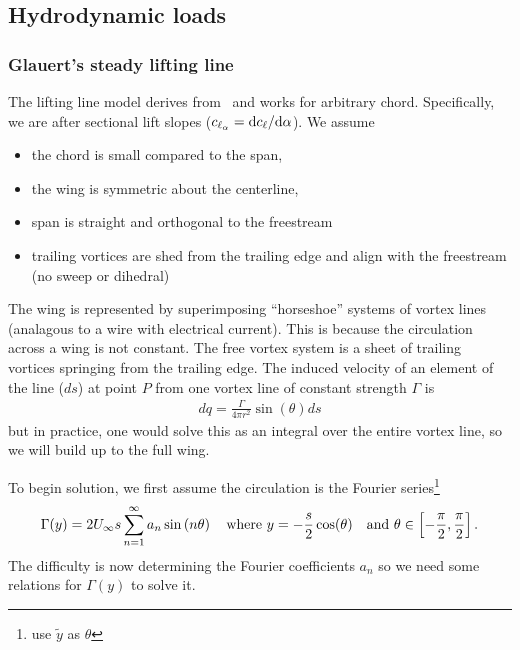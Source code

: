\documentclass[10pt]{article}
\newcommand{\be}{\begin{eqnarray}}
\newcommand{\ee}{\end{eqnarray}}
\newcommand{\Uinf}{U_{\infty}}
\newcommand{\tn}[1]{\textnormal{#1}}
\begin{document}
\subsection{Hydrodynamic loads}
% 
\subsubsection{Glauert's steady lifting line}
% 
The lifting line model derives from~\citet[Ch. XI]{Glauert1983a} and works for arbitrary chord.
Specifically, we are after sectional lift slopes ($\textstyle c_{\ell_\alpha} = \tn{d}c_\ell/\tn{d}\alpha$).
We assume
\begin{itemize}
    \item the chord is small compared to the span,
    \item the wing is symmetric about the centerline,
    \item span is straight and orthogonal to the freestream
    \item trailing vortices are shed from the trailing edge and align with the freestream (no sweep or dihedral)
\end{itemize}

The wing is represented by superimposing ``horseshoe'' systems of vortex lines (analagous to a wire with electrical current).
This is because the circulation across a wing is not constant.
The free vortex system is a sheet of trailing vortices springing from the trailing edge.
The induced velocity of an element of the line ($ds$) at point $P$ from one vortex line of constant strength $\Gamma$ is
\be
dq = \frac{\Gamma}{4 \pi r^2} \sin(\theta) ds
\ee
but in practice, one would solve this as an integral over the entire vortex line, so we will build up to the full wing.

To begin solution, we first assume the circulation is the Fourier series\footnote{\citet{Kerwin2010} use $\tilde{y}$ as $\theta$}
\be
\Gamma(y) = 2 \Uinf s \sum_{n=1}^{\infty} a_n \sin \left( n \theta \right)
\quad \tn{where }
y = -\frac{s}{2}\cos(\theta)
\quad \tn{and }
\theta \in \left[-\frac{\pi}{2},\frac{\pi}{2}\right]
.
\ee
The difficulty is now determining the Fourier coefficients $a_n$ so we need some relations for $\Gamma(y)$ to solve it.
\end{document}

